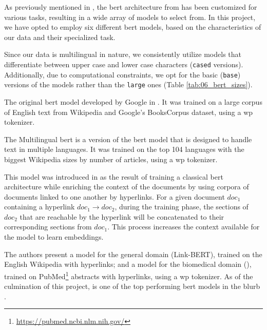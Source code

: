 \label{06_bert_models}



As previously mentioned in , the \gls{bert} architecture from  has been customized for various tasks, resulting in a wide array of models to select from. In this project, we have opted to employ six different \gls{bert} models, based on the characteristics of our data and their specialized task.

Since our data is multilingual in nature, we consistently utilize models that differentiate between upper case and lower case characters (\texttt{cased} versions). Additionally, due to computational constraints, we opt for the basic (\texttt{base}) versions of the models rather than the \texttt{large} ones (Table \ref{tab:06_bert_sizes}).




\label{06_bert_base}
The original \gls{bert} model developed by Google in . It was trained on a large corpus of English text from Wikipedia and Google’s BooksCorpus dataset, using a \gls{wp} tokenizer.

\label{06_bert_multilingual}
The Multilingual \gls{bert}  is a version of the \gls{bert} model that is designed to handle text in multiple languages. It was trained on the top 104 languages with the biggest Wikipedia sizes by number of articles, using a \gls{wp} tokenizer. 

\label{06_bert_biolinkbert}

This model was introduced in  as the result of training a classical \gls{bert} architecture while enriching the context of the documents by using corpora of documents linked to one another by hyperlinks. For a given document $doc_1$ containing a hyperlink $doc_1 \to doc_2$, during the training phase, the sections of $doc_2$ that are reachable by the hyperlink will be concatenated to their corresponding sections from $doc_1$. This process increases the context available for the model to learn embeddings. 

The authors present a model for the general domain (Link-BERT), trained on the English Wikipedia with hyperlinks; and a model for the biomedical domain (\bertbiolinkbert{}), trained on PubMed\footnote{\url{https://pubmed.ncbi.nlm.nih.gov/}} abstracts with hyperlinks, using a \gls{wp} tokenizer. As of the culmination of this project, \bertbiolinkbert{} is one of the top performing \gls{bert} models in the \gls{blurb} .


